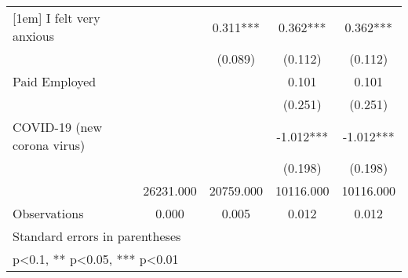 {\begin{tabular}{l*{4}{c}}
[1em]
I felt very anxious&            &    0.311***&    0.362***&    0.362***\\
                &            &  (0.089)   &  (0.112)   &  (0.112)   \\
[1em]
Paid Employed   &            &            &    0.101   &    0.101   \\
                &            &            &  (0.251)   &  (0.251)   \\
[1em]
COVID-19 (new corona virus)&            &            &   -1.012***&   -1.012***\\
                &            &            &  (0.198)   &  (0.198)   \\
\hline
\hspace{2mm}    &26231.000   &20759.000   &10116.000   &10116.000   \\
Observations    &    0.000   &    0.005   &    0.012   &    0.012   \\
\hline\hline
\multicolumn{5}{l}{\footnotesize Standard errors in parentheses}\\
\multicolumn{5}{l}{\footnotesize * p<0.1, ** p<0.05, *** p<0.01}\\
\end{tabular}
}

